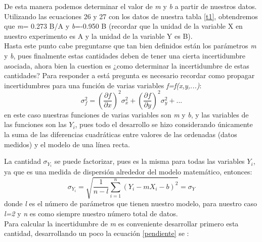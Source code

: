\documentclass[12pt,letterpaper]{report}
\begin{document}
De esta manera podemos determinar el valor de \textit{m} y \textit{b} a partir de nuestros datos. Utilizando las ecuaciones 26 y 27 con los  datos de nuestra tabla \ref{t1}, obtendremos que \textit{m}= 0.273 B/A y \textit{b}=-0.950 B (recordar que la unidad de la variable X en nuestro experimento es A y la unidad de la variable Y es B).\\
Hasta este punto cabe preguntarse que tan bien definidos están los parámetros \textit{m} y \textit{b}, pues finalmente estas cantidades deben de tener una cierta incertidumbre asociada, ahora bien la cuestion es ¿como determinar la incertidumbre de estas cantidades? Para responder a está pregunta es necesario recordar como propagar incertidumbres para una función de varias variables \textit{f=f(x,y,...)}:
\begin{equation}
\sigma_{f}^{2}=\left(  \dfrac{\partial f}{\partial x} \right) ^{2} \sigma_{x}^{2} + \left(  \dfrac{\partial f}{\partial y} \right) ^{2} \sigma_{y}^{2} + ...
\end{equation}
en este caso nuestras funciones de varias variables son \textit{m} y \textit{b}, y las variables de las funciones son las $ Y_{i} $, pues todo el desarrollo se hizo considerando únicamente la suma de las diferencias cuadráticas entre valores de las ordenadas (datos medidos) y el modelo de una línea recta.

La cantidad $ \sigma_{Y_{i}} $ se puede factorizar, pues es la misma para todas las variables $ Y_{i} $, ya que es una medida de dispersión alrededor del modelo matemático, entonces:
\begin{equation}\label{sigmay}
\sigma_{Y_{i}}=\sqrt{\dfrac{1}{n-l}\sum_{i=1}^{n}\left( Y_{i}-mX_{i}-b \right) ^{2}} =\sigma_{Y}
\end{equation}
donde \textit{l} es el número de parámetros que tienen nuestro modelo, para nuestro caso \textit{l=2} y \textit{n} es como siempre nuestro número total de datos. \\

Para calcular la incertidumbre de \textit{m} es conveniente desarrollar primero esta cantidad, desarrollando un poco la ecuación \ref{pendiente} se :
\end{document}
